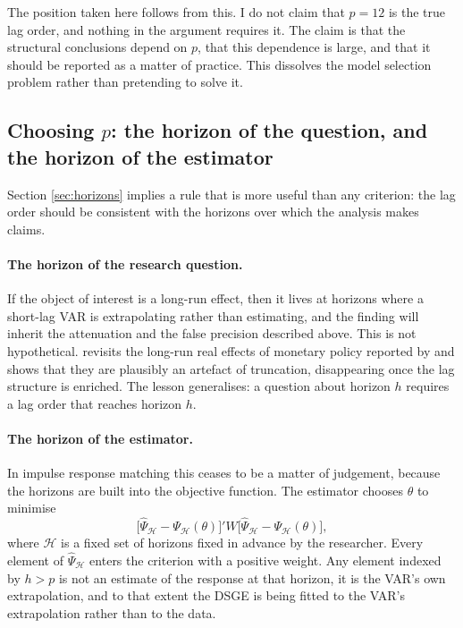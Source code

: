 The position taken here follows from this. I do not claim that $p=12$ is the true lag order,
and nothing in the argument requires it. The claim is that the structural conclusions depend on
$p$, that this dependence is large, and that it should be reported as a matter of practice.
This dissolves the model selection problem rather than pretending to solve it.

\subsection{Choosing \texorpdfstring{$p$}{p}: the horizon of the question, and the horizon of
the estimator}
\label{sec:choosingp}

Section \ref{sec:horizons} implies a rule that is more useful than any criterion: the lag order
should be consistent with the horizons over which the analysis makes claims.

\paragraph{The horizon of the research question.} If the object of interest is a long-run
effect, then it lives at horizons where a short-lag VAR is extrapolating rather than
estimating, and the finding will inherit the attenuation and the false precision described
above. This is not hypothetical. \citet{Baumeister2025} revisits the long-run real effects of
monetary policy reported by \citet{Jorda2024long_run_mp} and shows that they are plausibly an
artefact of truncation, disappearing once the lag structure is enriched.  The lesson generalises: a question
about horizon $h$ requires a lag order that reaches horizon $h$.

\paragraph{The horizon of the estimator.} In impulse response matching this ceases to be a
matter of judgement, because the horizons are built into the objective function. The estimator
chooses $\theta$ to minimise
\begin{equation}
    \bigl[\hat{\Psi}_{\mathcal{H}} - \Psi_{\mathcal{H}}(\theta)\bigr]'
    W
    \bigl[\hat{\Psi}_{\mathcal{H}} - \Psi_{\mathcal{H}}(\theta)\bigr],
    \label{eq:irfme}
\end{equation}
where $\mathcal{H}$ is a fixed set of horizons fixed in advance by the researcher. Every
element of $\hat{\Psi}_{\mathcal{H}}$ enters the criterion with a positive weight. Any element
indexed by $h > p$ is not an estimate of the response at that horizon, it is the VAR's own
extrapolation, and to that extent the DSGE is being fitted to the VAR's extrapolation rather
than to the data.

